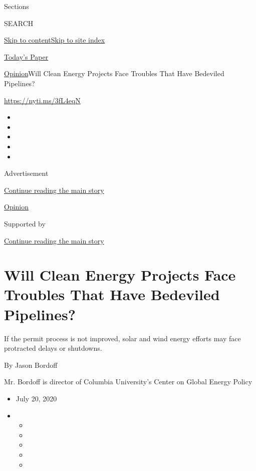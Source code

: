 Sections

SEARCH

\protect\hyperlink{site-content}{Skip to
content}\protect\hyperlink{site-index}{Skip to site index}

\href{https://myaccount.nytimes.com/auth/login?response_type=cookie\&client_id=vi}{}

\href{https://www.nytimes.com/section/todayspaper}{Today's Paper}

\href{/section/opinion}{Opinion}\textbar{}Will Clean Energy Projects
Face Troubles That Have Bedeviled Pipelines?

\href{https://nyti.ms/3fL4eqN}{https://nyti.ms/3fL4eqN}

\begin{itemize}
\item
\item
\item
\item
\item
\end{itemize}

Advertisement

\protect\hyperlink{after-top}{Continue reading the main story}

\href{/section/opinion}{Opinion}

Supported by

\protect\hyperlink{after-sponsor}{Continue reading the main story}

\hypertarget{will-clean-energy-projects-face-troubles-that-have-bedeviled-pipelines}{%
\section{Will Clean Energy Projects Face Troubles That Have Bedeviled
Pipelines?}\label{will-clean-energy-projects-face-troubles-that-have-bedeviled-pipelines}}

If the permit process is not improved, solar and wind energy efforts may
face protracted delays or shutdowns.

By Jason Bordoff

Mr. Bordoff is director of Columbia University's Center on Global Energy
Policy

\begin{itemize}
\item
  July 20, 2020
\item
  \begin{itemize}
  \item
  \item
  \item
  \item
  \item
  \end{itemize}
\end{itemize}

